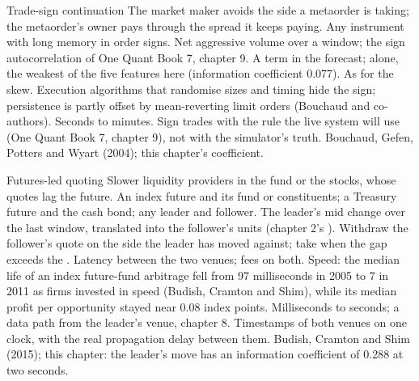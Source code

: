 \begin{strategyfile}{Trade-sign continuation}\label{strat:hf:short-horizon-alpha:sign}
 The market maker avoids the side a metaorder is taking; the metaorder's owner pays through the spread it keeps
paying.
 Any instrument with long memory in order signs.
 Net aggressive volume over a window; the sign autocorrelation of One Quant Book 7, chapter 9.
 A term in the forecast; alone, the weakest of the five features here (information coefficient 0.077).
 As for the skew.
 Execution algorithms that randomise sizes and timing hide the sign; persistence is partly offset by mean-reverting limit orders
(Bouchaud and co-authors).
 Seconds to minutes.
 Sign trades with the rule the live system will use (One Quant Book 7, chapter 9), not with the simulator's truth.
 Bouchaud, Gefen, Potters and Wyart (2004); this chapter's coefficient.
\end{strategyfile}

\begin{strategyfile}{Futures-led quoting}\label{strat:hf:short-horizon-alpha:futures}
 Slower liquidity providers in the fund or the stocks, whose quotes lag the future.
 An index future and its fund or constituents; a Treasury future and the cash bond; any leader and follower.
 The leader's mid change over the last window, translated into the follower's units (chapter 2's ).
 Withdraw the follower's quote on the side the leader has moved against; take when the gap exceeds the .
 Latency between the two venues; fees on both.
 Speed: the median life of an index future-fund arbitrage fell from 97 milliseconds in 2005 to 7 in 2011 as firms invested in
speed (Budish, Cramton and Shim), while its median profit per opportunity stayed near 0.08 index points.
 Milliseconds to seconds; a data path from the leader's venue, chapter 8.
 Timestamps of both venues on one clock, with the real propagation delay between them.
 Budish, Cramton and Shim (2015); this chapter: the leader's move has an information coefficient of 0.288 at two seconds.
\end{strategyfile}

